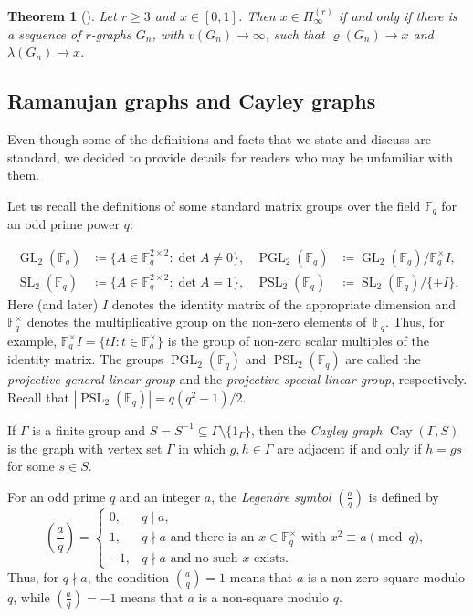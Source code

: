 \documentclass[10pt]{article}
\numberwithin{equation}{section}
\newtheorem{theorem}{Theorem}[section]
\DeclareMathOperator{\PSL}{PSL}
\DeclareMathOperator{\PGL}{PGL}
\DeclareMathOperator{\Cay}{Cay}
\newcommand{\F}{\mathbb{F}}
\begin{document}
\begin{theorem}[{\cite[Theorem~24]{Pikhurko2014}}]\label{thm:tight} Let $r\ge 3$ and $x\in[0,1]$. Then $x\in \Pi^{(r)}_\infty$ if and only if there is a sequence of $r$-graphs $G_n$, with $v(G_n)\to\infty$, such that $\varrho(G_n)\to x$ and $\lambda(G_n)\to x$. \end{theorem}

\subsection{Ramanujan graphs and Cayley graphs}


Even though some of the definitions and facts that we state and discuss are standard,
we decided to provide details for readers who may be unfamiliar with them.


Let us recall the definitions of some standard matrix groups over the field $\F_q$ for an odd prime power $q$:

\[
        \begin{aligned}
        \operatorname{GL}_2(\F_q)&\coloneqq \{A\in\F_q^{2\times 2}\colon\det A\ne 0\},&
        \PGL_2(\F_q)&\coloneqq \operatorname{GL}_2(\F_q)/\F_q^\times I,\\
        \operatorname{SL}_2(\F_q)&\coloneqq \{A\in\F_q^{2\times 2}\colon\det A=1\},&
        \PSL_2(\F_q)&\coloneqq \operatorname{SL}_2(\F_q)/\{\pm I\}.
        \end{aligned}
\]
Here (and later) $I$ denotes the identity matrix of the appropriate dimension and $\F_q^\times$ denotes the multiplicative group on the non-zero elements of~$\F_q$. Thus, for example,  $\F_q^\times I=\{tI\colon t\in\F_q^\times\}$ is the group of non-zero scalar multiples of the identity matrix. The groups $\PGL_2(\F_q)$ and $\PSL_2(\F_q)$ are called the \emph{projective general linear group} and the \emph{projective special linear group}, respectively. Recall that $|\PSL_2(\F_q)|=q(q^2-1)/2$.

If $\Gamma$ is a finite group and $S=S^{-1}\subseteq\Gamma\setminus\{1_\Gamma\}$, then the \emph{Cayley graph} $\Cay(\Gamma,S)$ is the graph with vertex set $\Gamma$ in which $g,h\in \Gamma$ are adjacent if and only if $h=gs$ for some $s\in S$.



For an odd prime $q$ and an integer $a$, the \emph{Legendre symbol} $\left(\frac{a}{q}\right)$ is defined by
\[
        \left(\frac{a}{q}\right)
        =
        \begin{cases}
        0, & q\mid a,\\
        1, & q\nmid a \text{ and there is an } x\in\mathbb F_q^\times
        \text{ with } x^2\equiv a\pmod q,\\
        -1, & q\nmid a \text{ and no such } x \text{ exists}.
        \end{cases}
\]
Thus, for $q\nmid a$, the condition $\left(\frac{a}{q}\right)=1$ means that $a$ is a non-zero square modulo $q$, while $\left(\frac{a}{q}\right)=-1$ means that $a$ is a non-square modulo $q$.
\end{document}
